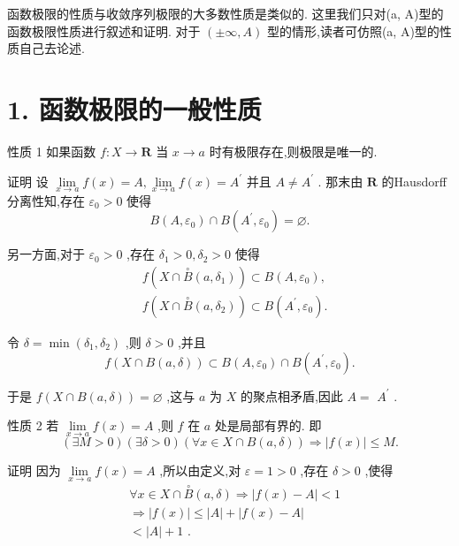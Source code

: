 函数极限的性质与收敛序列极限的大多数性质是类似的. 这里我们只对(a, A)型的函数极限性质进行叙述和证明. 对于 $\left( {\pm \infty ,A}\right)$ 型的情形,读者可仿照(a, A)型的性质自己去论述.

\section*{1. 函数极限的一般性质}

性质 1 如果函数 $f : X \rightarrow  \mathbf{R}$ 当 $x \rightarrow  a$ 时有极限存在,则极限是唯一的.

证明 设 $\mathop{\lim }\limits_{{x \rightarrow  a}}f\left( x\right)  = A,\mathop{\lim }\limits_{{x \rightarrow  a}}f\left( x\right)  = {A}^{\prime }$ 并且 $A \neq  {A}^{\prime }$ . 那末由 $\mathbf{R}$ 的Hausdorff分离性知,存在 ${\varepsilon }_{0} > 0$ 使得
$$B\left( {A,{\varepsilon }_{0}}\right)  \cap  B\left( {{A}^{\prime },{\varepsilon }_{0}}\right)  = \varnothing .$$

另一方面,对于 ${\varepsilon }_{0} > 0$ ,存在 ${\delta }_{1} > 0,{\delta }_{2} > 0$ 使得
\begin{align*}
	&f\left( {X \cap  \overset{ \circ  }{B}\left( {a,{\delta }_{1}}\right) }\right)  \subset  B\left( {A,{\varepsilon }_{0}}\right) ,\\
	&f\left( {X \cap  \overset{ \circ  }{B}\left( {a,{\delta }_{2}}\right) }\right)  \subset  B\left( {{A}^{\prime },{\varepsilon }_{0}}\right) .
\end{align*}

令 $\delta  = \min \left( {{\delta }_{1},{\delta }_{2}}\right)$ ,则 $\delta  > 0$ ,并且
$$f\left( {X \cap  B\left( {a,\delta }\right) }\right)  \subset  B\left( {A,{\varepsilon }_{0}}\right)  \cap  B\left( {{A}^{\prime },{\varepsilon }_{0}}\right) .$$

于是 $f\left( {X \cap  B\left( {a,\delta }\right) }\right)  = \varnothing$ ,这与 $a$ 为 $X$ 的聚点相矛盾,因此 $A =$  ${A}^{\prime }$ .

性质 2 若 $\mathop{\lim }\limits_{{x \rightarrow  a}}f\left( x\right)  = A$ ,则 $f$ 在 $a$ 处是局部有界的. 即
$$\left( {\exists M > 0}\right) \left( {\exists \delta  > 0}\right) \left( {\forall x \in  X \cap  B\left( {a,\delta }\right) }\right)  \Rightarrow  \left| {f\left( x\right) }\right|  \leq  M.$$

证明 因为 $\mathop{\lim }\limits_{{x \rightarrow  a}}f\left( x\right)  = A$ ,所以由定义,对 $\varepsilon  = 1 > 0$ ,存在 $\delta  > 0$ ,使得
\begin{align*}
	&\forall x \in  X \cap  \overset{ \circ  }{B}\left( {a,\delta }\right)  \Rightarrow  \left| {f\left( x\right)  - A}\right|  < 1\\
	&\Rightarrow  \left| {f\left( x\right) }\right|  \leq  \left| A\right|  + \left| {f\left( x\right)  - A}\right|\\
	&< \left| A\right|  + 1\text{ . }
\end{align*}

